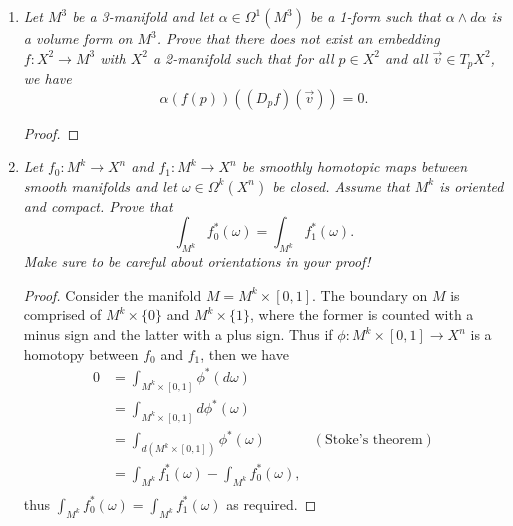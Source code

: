 \documentclass{article}
\begin{document}
\begin{enumerate}[label={\bf Q\arabic*:}]
\begin{proof}
      Let $v_1,\ldots,v_n$ be a basis of the tangent space $T_eG$. Then the
      $n$ vector fields $dL_g(v_1),\ldots,dL_g(v_n)\in T_gG$ are linearly
      independent at $g\in M$: First, note that each $dL_g(v_i)$ is a smooth
      vector field from the smoothness of the group operations. Now since
      $L_g$ is a diffeomorphism, $dL_g$ is an isomorphism. Then since
      $v_1,\ldots,v_n$ form a basis of $T_eG$, their images
      $dL_g(v_1),\ldots,dL_g(v_n)$ form a basis of $T_gG$. \\

      So the map $\phi:G\times \mathbb{R}^n\rightarrow TG$ defined by
      $\phi((g,V))=(g,dL_g)_e(V)$ is a smooth vector-bundle isomorphism,
      thus $TG\cong G\times\mathbb{R}^n$.
    \end{proof}

  \item \it Let $M^3$ be a 3-manifold and let $\alpha\in\Omega^1(M^3)$ be a
    1-form such that $\alpha\wedge d\alpha$ is a volume form on $M^3$.
    Prove that there does not exist an embedding $f:X^2\rightarrow M^3$
    with $X^2$ a 2-manifold such that for all $p\in X^2$ and all
    $\vec{v}\in T_pX^2$, we have
    \[\alpha(f(p))((D_pf)(\vec{v}))=0.\]

    \begin{proof}
    \end{proof}

  \item \it Let $f_0:M^k\rightarrow X^n$ and $f_1:M^k\rightarrow X^n$ be
    smoothly homotopic maps between smooth manifolds and let
    $\omega\in\Omega^k(X^n)$ be closed. Assume that $M^k$ is oriented and
    compact. Prove that
    \[\int_{M^k} f_0^*(\omega)= \int_{M^k} f_1^*(\omega).\]
    Make sure to be careful about orientations in your proof!

    \begin{proof}
      Consider the manifold $M=M^k\times[0,1]$. The boundary on $M$
      is comprised of $M^k\times\{0\}$ and $M^k\times\{1\}$, where the
      former is counted with a minus sign and the latter with a plus sign.
      Thus if $\phi:M^k\times[0,1]\rightarrow X^n$ is a homotopy between
      $f_0$ and $f_1$, then we have
      \begin{align*}
        0 &=\int_{M^k\times[0,1]} \phi^*(d\omega) \\
        &=\int_{M^k\times[0,1]} d\phi^*(\omega) \\
        &=\int_{d(M^k\times[0,1])} \phi^*(\omega) &(\text{Stoke's theorem})
          \\
        &=\int_{M^k} f_1^*(\omega) - \int_{M^k} f_0^*(\omega), \\
      \end{align*}
      thus $\int_{M^k} f_0^*(\omega)= \int_{M^k} f_1^*(\omega)$ as
      required.
    \end{proof}
\end{enumerate}
\end{document}
